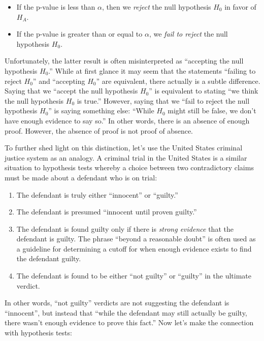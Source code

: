 \documentclass[
]{book}
\providecommand{\tightlist}{%
  \setlength{\itemsep}{0pt}\setlength{\parskip}{0pt}}
\begin{document}
\begin{itemize}
\tightlist
\item
  If the p-value is less than \(\alpha\), then we \emph{reject} the null hypothesis \(H_0\) in favor of \(H_A\).
\item
  If the p-value is greater than or equal to \(\alpha\), we \emph{fail to reject} the null hypothesis \(H_0\).
\end{itemize}

Unfortunately, the latter result is often misinterpreted as ``accepting the null hypothesis \(H_0\).'' While at first glance it may seem that the statements ``failing to reject \(H_0\)'' and ``accepting \(H_0\)'' are equivalent, there actually is a subtle difference. Saying that we ``accept the null hypothesis \(H_0\)'' is equivalent to stating ``we think the null hypothesis \(H_0\) is true.'' However, saying that we ``fail to reject the null hypothesis \(H_0\)'' is saying something else: ``While \(H_0\) might still be false, we don't have enough evidence to say so.'' In other words, there is an absence of enough proof. However, the absence of proof is not proof of absence.

To further shed light on this distinction,  let's use the United States criminal justice system as an analogy. A criminal trial in the United States is a similar situation to hypothesis tests whereby a choice between two contradictory claims must be made about a defendant who is on trial:

\begin{enumerate}
\def\labelenumi{\arabic{enumi}.}
\tightlist
\item
  The defendant is truly either ``innocent'' or ``guilty.''
\item
  The defendant is presumed ``innocent until proven guilty.''
\item
  The defendant is found guilty only if there is \emph{strong evidence} that the defendant is guilty. The phrase ``beyond a reasonable doubt'' is often used as a guideline for determining a cutoff for when enough evidence exists to find the defendant guilty.
\item
  The defendant is found to be either ``not guilty'' or ``guilty'' in the ultimate verdict.
\end{enumerate}

In other words, ``not guilty'' verdicts are not suggesting the defendant is ``innocent'', but instead that ``while the defendant may still actually be guilty, there wasn't enough evidence to prove this fact.'' Now let's make the connection with hypothesis tests:
\end{document}
